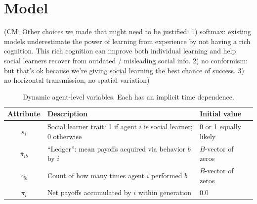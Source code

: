 \documentclass[letterpaper,11.5pt]{scrartcl}
\newcommand{\cm}[1]{{\textcolor{mypurple} {({\tiny CM:} #1)}}}
\begin{document}
\section{Model}

\cm{Other choices we made that might need to be justified: 1) softmax: existing models underestimate the power of learning from experience by not having a rich cognition. This rich cognition can improve both individual learning and help social learners recover from outdated / misleading social info. 2) no conformism: but that's ok because we're giving social learning the best chance of success. 3) no horizontal transmission, no spatial variation}

\begin{table}[h]
    \caption{Dynamic agent-level variables. Each has an implicit time dependence.}
    \label{tab:modelParameters}
    \centering %
    \begin{tabular}{cp{4.0in}p{1.25in}} \toprule

        Attribute & Description & Initial value \\ 

        \midrule  

        $s_i$  & Social learner trait: 1 if agent $i$ is social learner; 0 otherwise & 0
        or 1 equally likely \\

        $\bar\pi_{ib}$ & ``Ledger'': mean payoffs acquired via behavior $b$ by $i$ 
                       & $B$-vector of zeros \\

        $c_{ib}$ & Count of how many times agent $i$ performed $b$ 
              & $B$-vector of zeros \\

        $\pi_i$ & Net payoffs accumulated by $i$ within generation
                                & 0.0 \\
        \bottomrule
    \end{tabular}
\end{table}
\end{document}
